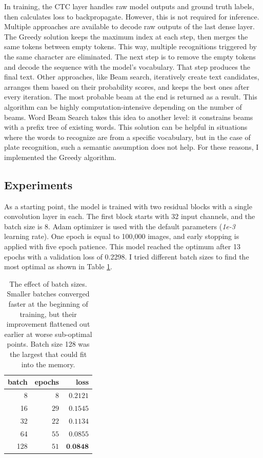In training, the CTC layer handles raw model outputs and ground truth labels, then calculates loss to backpropagate. However, this is not required for inference. Multiple approaches are available to decode raw outputs of the last dense layer. The Greedy solution keeps the maximum index at each step, then merges the same tokens between empty tokens. This way, multiple recognitions triggered by the same character are eliminated. The next step is to remove the empty tokens and decode the sequence with the model's vocabulary. That step produces the final text. Other approaches, like Beam search, iteratively create text candidates, arranges them based on their probability scores, and keeps the best ones after every iteration. The most probable beam at the end is returned as a result. This algorithm can be highly computation-intensive depending on the number of beams. Word Beam Search\cite{WordBeamSearch} takes this idea to another level: it constrains beams with a prefix tree of existing words. This solution can be helpful in situations where the words to recognize are from a specific vocabulary, but in the case of plate recognition, such a semantic assumption does not help. For these reasons, I implemented the Greedy algorithm.

\subsection{Experiments}

As a starting point, the model is trained with two residual blocks with a single convolution layer in each. The first block starts with 32 input channels, and the batch size is 8. Adam optimizer\cite{Adam} is used with the default parameters (\textit{1e-3} learning rate). One epoch is equal to 100,000 images, and early stopping is applied with five epoch patience. This model reached the optimum after 13 epochs with a validation loss of 0.2298. I tried different batch sizes to find the most optimal as shown in Table \ref{tab:batch_sizes}.

\begin{table}[htb]
\caption{The effect of batch sizes. Smaller batches converged faster at the beginning of training, but their improvement flattened out earlier at worse sub-optimal points. Batch size 128 was the largest that could fit into the memory.}
\label{tab:batch_sizes}
\noindent
\centering
\begin{tabular*}
{\columnwidth}{@{\extracolsep{\stretch{1}}}*{3}{r}@{}}
    batch & epochs & loss\\ \hline
    8 & $8$ & $0.2121$ \\
    16 & $29$ & $0.1545$ \\
    32 & $22$ & $0.1134$ \\
    64 & $55$ & $0.0855$ \\
    128 & $51$ & $\textbf{0.0848}$ \\                   
\end{tabular*}
\end{table}


